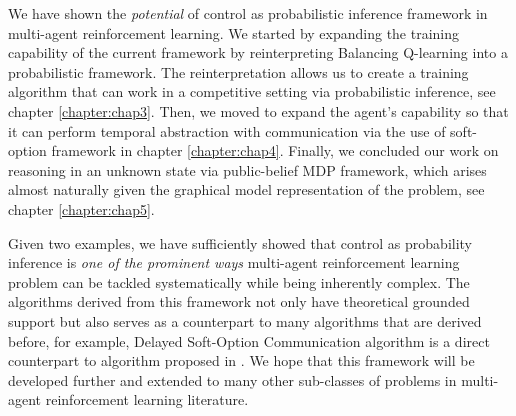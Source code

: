\label{sec:chap6-summary}
We have shown the \textit{potential} of control as probabilistic inference framework in multi-agent reinforcement learning. We started by expanding the training capability of the current framework by reinterpreting Balancing Q-learning into a probabilistic framework. The reinterpretation allows us to create a training algorithm that can work in a competitive setting via probabilistic inference, see chapter \ref{chapter:chap3}. Then, we moved to expand the agent's capability so that it can perform temporal abstraction with communication via the use of soft-option framework \cite{igl2019multitask} in chapter \ref{chapter:chap4}. Finally, we concluded our work on reasoning in an unknown state via public-belief MDP framework, which arises almost naturally given the graphical model representation of the problem, see chapter \ref{chapter:chap5}. 

Given two examples, we have sufficiently showed that control as probability inference is \textit{one of the prominent ways} multi-agent reinforcement learning problem can be tackled systematically while being inherently complex. The algorithms derived from this framework not only have theoretical grounded support but also serves as a  counterpart to many algorithms that are derived before, for example, Delayed Soft-Option Communication algorithm is a direct counterpart to algorithm proposed in \cite{han2019multi}. We hope that this framework will be developed further and extended to many other sub-classes of problems in multi-agent reinforcement learning literature. 
